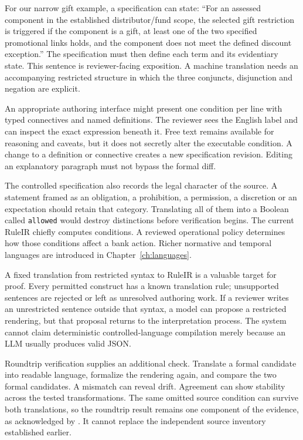 For our narrow gift example, a specification can state: ``For an assessed
component in the established distributor/fund scope, the selected gift
restriction is triggered if the component is a gift, at least one of the two
specified promotional links holds, and the component does not meet the defined
discount exception.'' The specification must then define each term and its
evidentiary state. This sentence is reviewer-facing exposition. A machine
translation needs an accompanying restricted structure in which the three
conjuncts, disjunction and negation are explicit.

An appropriate authoring interface might present one condition per line with
typed connectives and named definitions. The reviewer sees the English label
and can inspect the exact expression beneath it. Free text remains available
for reasoning and caveats, but it does not secretly alter the executable
condition. A change to a definition or connective creates a new specification
revision. Editing an explanatory paragraph must not bypass the formal diff.


The controlled specification also records the legal character of the source.
A statement framed as an obligation, a prohibition, a permission, a discretion
or an expectation should retain that category. Translating all of them into a
Boolean called \texttt{allowed} would destroy distinctions before verification
begins. The current RuleIR chiefly computes conditions. A reviewed operational
policy determines how those conditions affect a bank action. Richer normative
and temporal languages are introduced in Chapter~\ref{ch:languages}.

A fixed translation from restricted syntax to RuleIR is a valuable target for
proof. Every permitted construct has a known translation rule; unsupported
sentences are rejected or left as unresolved authoring work. If a reviewer
writes an unrestricted sentence outside that syntax, a model can propose a
restricted rendering, but that proposal returns to the interpretation process.
The system cannot claim deterministic controlled-language compilation merely
because an LLM usually produces valid JSON.

Roundtrip verification supplies an additional check. Translate a formal
candidate into readable language, formalize the rendering again, and compare
the two formal candidates. A mismatch can reveal drift. Agreement can show
stability across the tested transformations. The same omitted source condition
can survive both translations, so the roundtrip result remains one component
of the evidence, as acknowledged by \citet[method and limitations]{roundtrip2026}.
It cannot replace the independent source inventory established earlier.

